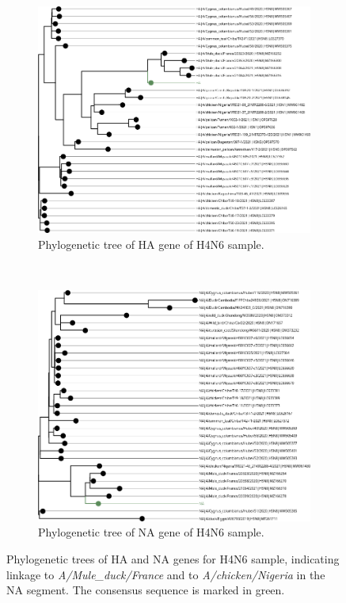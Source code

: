 \begin{figure}
    \centering
    \begin{subfigure}[]{0.5\textheight}
        \includegraphics[width=1.0\textwidth]{media/4-aiv-s4-tree-ha.png}
        \caption{Phylogenetic tree of HA gene of H4N6 sample.}
		\label{fig:apx-aiv-trees-s4-ha}
    \end{subfigure} \\
	\vspace*{20pt}
    \begin{subfigure}[]{0.5\textheight}
        \includegraphics[width=1.0\textwidth]{media/4-aiv-s4-tree-na.png}
        \caption{Phylogenetic tree of NA gene of H4N6 sample.}
		\label{fig:apx-aiv-trees-s4-na}
    \end{subfigure} 
	\caption[Phylogenetic trees of HA and NA genes for H4N6 sample.]{Phylogenetic trees of HA and NA genes for H4N6 sample, indicating linkage to \textit{A/Mule\_duck/France} and to \textit{A/chicken/Nigeria} in the NA segment. The consensus sequence is marked in green.}
\label{fig:apx-aiv-trees-s4}
\end{figure}

